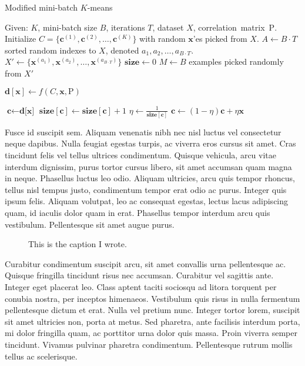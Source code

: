 \begin{algorithm}
\caption{Modified mini-batch $K$-means} \label{modifiedminibatch}
\begin{algorithmic}[1]
\State Given: $K$, mini-batch size $B$, iterations $T$, dataset $X$, correlation~matrix~$\mathrm{P}$.
\State Initialize $C = \{\mathbf{c}^{(1)}, \mathbf{c}^{(2)}, \ldots, \mathbf{c}^{(K)}\}$ with random $\mathbf{x}$'es picked from $X$.
\State $A \gets B \cdot T$ sorted random indexes to $X$, denoted $a_1, a_2, \ldots, a_{B\cdot T}$.
\State $X' \gets \{\mathbf{x}^{(a_1)}, \mathbf{x}^{(a_2)}, \ldots, \mathbf{x}^{(a_{B\cdot T})}\}$ 
\State $\textbf{size} \gets 0$
    \State $M \gets B$ examples picked randomly from $X'$
    
     
        \State $\textbf{d}[\textbf{x}] \gets f(C,\mathbf{x}, \mathrm{P})$ 
    \EndFor
    
     
        \State $\textbf{c} \gets \textbf{d[x]}$ 
        \State $\textbf{size}[\textbf{c}] \gets \textbf{size}[\textbf{c}] + 1$ 
        \State $\eta \gets \frac{1}{\textbf{size}[\textbf{c}]}$       
        \State $\textbf{c} \gets (1 - \eta)\textbf{c}+\eta\textbf{x}$ 
    \EndFor
\EndFor
\State {}
\end{algorithmic}
\end{algorithm}

Fusce id suscipit sem. Aliquam venenatis nibh nec nisl luctus vel consectetur neque dapibus. Nulla feugiat egestas turpis, ac viverra eros cursus sit amet. Cras tincidunt felis vel tellus ultrices condimentum. Quisque vehicula, arcu vitae interdum dignissim, purus tortor cursus libero, sit amet accumsan quam magna in neque. Phasellus luctus leo odio. Aliquam ultricies, arcu quis tempor rhoncus, tellus nisl tempus justo, condimentum tempor erat odio ac purus. Integer quis ipsum felis. Aliquam volutpat, leo ac consequat egestas, lectus lacus adipiscing quam, id iaculis dolor quam in erat. Phasellus tempor interdum arcu quis vestibulum. Pellentesque sit amet augue purus. 
\begin{figure}[htbp]
    \centering
    \caption{This is the caption I wrote.}
    \label{fig:label}
\end{figure}
Curabitur condimentum suscipit arcu, sit amet convallis urna pellentesque ac. Quisque fringilla tincidunt risus nec accumsan. Curabitur vel sagittis ante. Integer eget placerat leo. Class aptent taciti sociosqu ad litora torquent per conubia nostra, per inceptos himenaeos. Vestibulum quis risus in nulla fermentum pellentesque dictum et erat. Nulla vel pretium nunc. Integer tortor lorem, suscipit sit amet ultricies non, porta at metus. Sed pharetra, ante facilisis interdum porta, mi dolor fringilla quam, ac porttitor urna dolor quis massa. Proin viverra semper tincidunt. Vivamus pulvinar pharetra condimentum. Pellentesque rutrum mollis tellus ac scelerisque.


